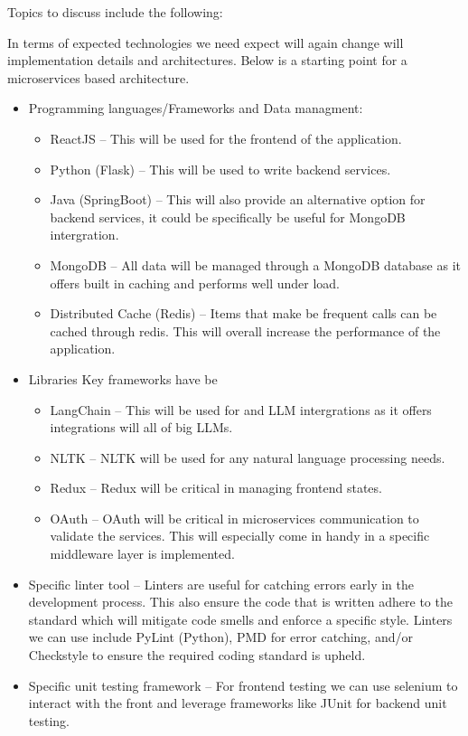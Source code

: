 \documentclass{article}
\begin{document}
Topics to discuss include the following:


In terms of expected technologies we need expect will again change will implementation details and architectures. Below is a starting point for a microservices based architecture.


\begin{itemize}
  \item Programming languages/Frameworks and Data managment:
    \begin{itemize}
      \item ReactJS -- This will be used for the frontend of the application.
      \item Python (Flask) -- This will be used to write backend services.
      \item Java (SpringBoot) -- This will also provide an alternative option for backend services, it could be specifically be useful for MongoDB intergration.
      \item MongoDB -- All data will be managed through a MongoDB database as it offers built in caching and performs well under load.
      \item Distributed Cache (Redis) -- Items that make be frequent calls can be cached through redis. This will overall increase the performance of the application.
    \end{itemize}
    

  \item Libraries
    Key frameworks have be
    \begin{itemize}
      \item LangChain -- This will be used for and LLM intergrations as it offers integrations will all of big LLMs.
      \item NLTK -- NLTK will be used for any natural language processing needs. 
      \item Redux -- Redux will be critical in managing frontend states.
      \item OAuth -- OAuth will be critical in microservices communication to validate the services. This will especially come in handy in a specific middleware layer is implemented.
    \end{itemize}

  \item Specific linter tool -- Linters are useful for catching errors early in the development process. This also ensure the code that is written adhere to the standard which will mitigate code smells and enforce a specific style. Linters we can use include PyLint (Python), PMD for error catching, and/or Checkstyle to ensure the required coding standard is upheld.
  \item Specific unit testing framework -- For frontend testing we can use selenium to interact with the front and leverage frameworks like JUnit for backend unit testing. 
    

\end{itemize}
\end{document}

